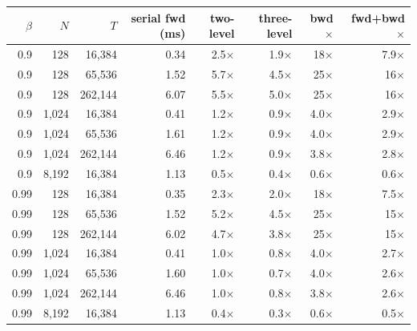 \begin{tabular}{rrrrrrrr}
\toprule
$\beta$ & $N$ & $T$ & serial fwd (ms) & two-level & three-level & bwd $\times$ & fwd+bwd $\times$\\
\midrule
0.9 & 128 & 16{,}384 & 0.34 & 2.5$\times$ & 1.9$\times$ & 18$\times$ & 7.9$\times$\\
0.9 & 128 & 65{,}536 & 1.52 & 5.7$\times$ & 4.5$\times$ & 25$\times$ & 16$\times$\\
0.9 & 128 & 262{,}144 & 6.07 & 5.5$\times$ & 5.0$\times$ & 25$\times$ & 16$\times$\\
0.9 & 1{,}024 & 16{,}384 & 0.41 & 1.2$\times$ & 0.9$\times$ & 4.0$\times$ & 2.9$\times$\\
0.9 & 1{,}024 & 65{,}536 & 1.61 & 1.2$\times$ & 0.9$\times$ & 4.0$\times$ & 2.9$\times$\\
0.9 & 1{,}024 & 262{,}144 & 6.46 & 1.2$\times$ & 0.9$\times$ & 3.8$\times$ & 2.8$\times$\\
0.9 & 8{,}192 & 16{,}384 & 1.13 & 0.5$\times$ & 0.4$\times$ & 0.6$\times$ & 0.6$\times$\\
0.99 & 128 & 16{,}384 & 0.35 & 2.3$\times$ & 2.0$\times$ & 18$\times$ & 7.5$\times$\\
0.99 & 128 & 65{,}536 & 1.52 & 5.2$\times$ & 4.5$\times$ & 25$\times$ & 15$\times$\\
0.99 & 128 & 262{,}144 & 6.02 & 4.7$\times$ & 3.8$\times$ & 25$\times$ & 15$\times$\\
0.99 & 1{,}024 & 16{,}384 & 0.41 & 1.0$\times$ & 0.8$\times$ & 4.0$\times$ & 2.7$\times$\\
0.99 & 1{,}024 & 65{,}536 & 1.60 & 1.0$\times$ & 0.7$\times$ & 4.0$\times$ & 2.6$\times$\\
0.99 & 1{,}024 & 262{,}144 & 6.46 & 1.0$\times$ & 0.8$\times$ & 3.8$\times$ & 2.6$\times$\\
0.99 & 8{,}192 & 16{,}384 & 1.13 & 0.4$\times$ & 0.3$\times$ & 0.6$\times$ & 0.5$\times$\\
\bottomrule
\end{tabular}
